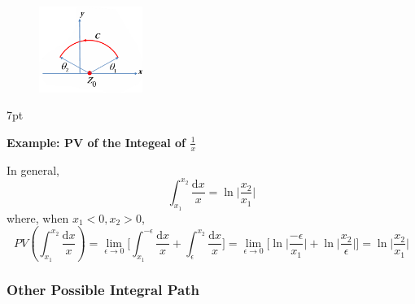 \documentclass[10pt]{article}
\newcommand{\dd}{\mathrm{d}}
\newenvironment{formal}[2]{%
	\def\FrameCommand{%
		\hspace{1pt}%
		{\color{#1}\vrule width 2pt}%
		{\color{#2}\vrule width 4pt}%
		\colorbox{#2}%
	}%
	\MakeFramed{\advance\hsize-\width\FrameRestore}%
	\noindent\hspace{-4.55pt}%
	\begin{adjustwidth}{}{7pt}%
		\vspace{2pt}\vspace{2pt}%
	}
	{%
		\vspace{2pt}\end{adjustwidth}\endMakeFramed%
}
\begin{document}
\begin{figure}
	\centering
	\includegraphics[width=0.3\textwidth]{img3-5}
\end{figure}

\begin{formal}{Brown}{brownshade}
	
	\textbf{Example: PV of the Integeal of $\frac{1}{x}$}

	\noindent In general,
	\[
	\int_{x_1}^{x_2} \frac{\dd x}{x} = \ln \bigg| \frac{x_2}{x_1} \bigg|
	\]
	where, when $x_1 < 0, x_2 > 0$,
	\[
	PV(\int_{x_1}^{x_2} \frac{\dd x}{x}) = \lim_{\epsilon\to 0} \bigg[ \int_{x_1}^{-\epsilon} \frac{\dd x}{x} + \int_{\epsilon}^{x_2} \frac{\dd x}{x} \bigg] = \lim_{\epsilon\to 0} \bigg[ \ln \bigg| \frac{-\epsilon}{x_1} \bigg| + \ln \bigg| \frac{x_2}{\epsilon} \bigg| \bigg] = \ln \bigg| \frac{x_2}{x_1} \bigg|
	\]

\end{formal}

\subsubsection{Other Possible Integral Path}
\end{document}
